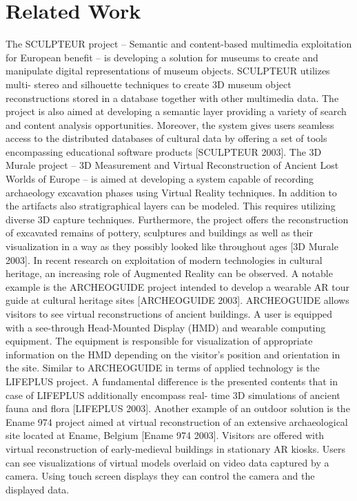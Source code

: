 \section{Related Work}
The SCULPTEUR project – Semantic and content-based multimedia exploitation for European benefit – is developing a solution for museums to create and manipulate digital representations of museum objects. SCULPTEUR utilizes multi- stereo and silhouette techniques to create 3D museum object reconstructions stored in a database together with other multimedia data. The project is also aimed at developing a semantic layer providing a variety of search and content analysis opportunities. Moreover, the system gives users seamless access to the distributed databases of cultural data by offering a set of tools encompassing educational software products [SCULPTEUR 2003].
The 3D Murale project – 3D Measurement and Virtual Reconstruction of Ancient Lost Worlds of Europe – is aimed at developing a system capable of recording archaeology excavation phases using Virtual Reality techniques. In addition to the artifacts also stratigraphical layers can be modeled. This requires utilizing diverse 3D capture techniques. Furthermore, the project offers the reconstruction of excavated remains of pottery, sculptures and buildings as well as their visualization in a way as they possibly looked like throughout ages [3D Murale 2003].
In recent research on exploitation of modern technologies in cultural heritage, an increasing role of Augmented Reality can be observed. A notable example is the ARCHEOGUIDE project intended to develop a wearable AR tour guide at cultural heritage sites [ARCHEOGUIDE 2003]. ARCHEOGUIDE allows visitors to see virtual reconstructions of ancient buildings. A user is equipped with a see-through Head-Mounted Display (HMD) and wearable computing equipment. The equipment is responsible for visualization of appropriate information on the HMD depending on the visitor’s position and orientation in the site. Similar to ARCHEOGUIDE in terms of applied technology is the LIFEPLUS project. A fundamental difference is the presented contents that in case of LIFEPLUS additionally encompass real- time 3D simulations of ancient fauna and flora [LIFEPLUS 2003].
Another example of an outdoor solution is the Ename 974 project aimed at virtual reconstruction of an extensive archaeological site located at Ename, Belgium [Ename 974 2003]. Visitors are offered with virtual reconstruction of early-medieval buildings in stationary AR kiosks. Users can see visualizations of virtual models overlaid on video data captured by a camera. Using touch screen displays they can control the camera and the displayed data.
